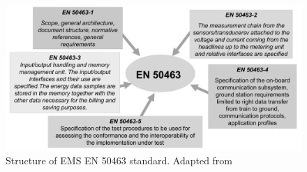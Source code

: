 \begin{figure}[h!]
	\centering
	\includegraphics[width=\textwidth,keepaspectratio]{figures/34.SmartM/gatti2011}
	\caption{Structure of \ac{EMS} EN 50463 standard. Adapted from \cite{gatti2011}}
	\label{fig:gatti2011}
\end{figure}






